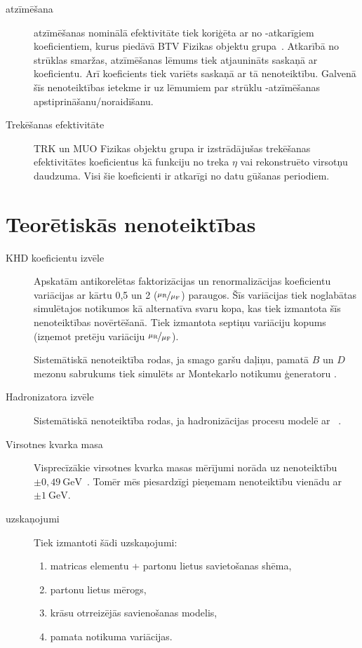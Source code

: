 \begin{description}
\item[\cPqb atzīmēšana] \cPqb atzīmēšanas nominālā efektivitāte tiek koriģēta ar no \pt-atkarīgiem koeficientiem, kurus piedāvā BTV Fizikas objektu grupa~\cite{twiki:BTV}. Atkarībā no strūklas smaržas, \cPqb atzīmēšanas lēmums tiek atjaunināts saskaņā ar koeficientu. Arī koeficients tiek variēts saskaņā ar tā nenoteiktību. Galvenā šīs nenoteiktības ietekme ir uz lēmumiem par strūklu \cPqb-atzīmēšanas apstiprināšanu/noraidīšanu.
  
\item[Trekēšanas efektivitāte] TRK un MUO Fizikas objektu grupa ir izstrādājušas trekēšanas efektivitātes koeficientus kā funkciju no treka $\eta$ vai rekonstruēto virsotņu daudzuma. Visi šie koeficienti ir atkarīgi no datu gūšanas periodiem.
\end{description}

\section{Teorētiskās nenoteiktības}
\begin{description}
\item[KHD koeficientu izvēle] Apskatām antikorelētas faktorizācijas un renormalizācijas koeficientu variācijas ar kārtu 0,5 un 2 ($\nicefrac{\mu_\text{R}}{\mu_\text{F}}$) \ttbar paraugos. Šīs variācijas tiek noglabātas simulētajos notikumos kā alternatīva svaru kopa, kas tiek izmantota šīs nenoteiktības novērtēšanā. Tiek izmantota septiņu variāciju kopums (izņemot pretēju variāciju $\nicefrac{\mu_\text{R}}{\mu_\text{F}}$).

\item[\EVTGEN] Sistemātiskā nenoteiktība rodas, ja smago garšu daļiņu, pamatā $B$ un $D$ mezonu sabrukums tiek simulēts ar Montekarlo notikumu ģeneratoru \EVTGEN.

\item[Hadronizatora izvēle] Sistemātiskā nenoteiktība rodas, ja hadronizācijas procesu modelē ar \HERWIGpp~\cite{Bahr:2008pv}. 

\item[Virsotnes kvarka masa] Visprecīzākie virsotnes kvarka masas mērījumi norāda uz nenoteiktību $\pm0,49~\text{GeV}$~\cite{Khachatryan:2015hba}. Tomēr mēs piesardzīgi pieņemam nenoteiktību vienādu ar $\pm1~\text{GeV}$. 

\item[\PYTHIA uzskaņojumi] Tiek izmantoti šādi \PYTHIA uzskaņojumi:
  \begin{enumerate}
  \item matricas elementu + partonu lietus savietošanas shēma,
  \item partonu lietus mērogs,
  \item krāsu otrreizējās savienošanas modelis,
  \item pamata notikuma variācijas.
  \end{enumerate}
\end{description}

